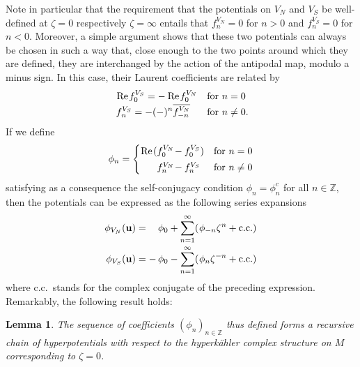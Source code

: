 \documentclass[11pt]{amsart}
\newtheorem{lemma}[theorem]{Lemma}
\theoremstyle{remark}
\theoremstyle{remark}
\theoremstyle{definition}
\theoremstyle{definition}
\theoremstyle{definition}
\newcommand{\0}{{\scriptstyle 0'}} %
\newcommand{\1}{{\scriptstyle 1'}}
\newcommand{\pt}{\hspace{1pt}} %
\newcommand{\hp}{\hspace{0.5pt}} %
\renewcommand{\Re}{\hp\mbox{Re}\pt} %
\begin{document}
Note in particular that the requirement that the potentials on $V_N$ and $V_S$ be well-defined at $\zeta = 0$ respectively $\zeta = \infty$ entails that $f^{V_N}_n \!= 0$ for $n>0$ and $f^{V_S}_n \!= 0$ for $n<0$. Moreover, a simple argument shows that these two potentials can always be chosen in such a way that, close enough to the two points around which they are defined, they are interchanged by the action of the antipodal map, modulo a minus sign. In this case, their Laurent coefficients are related by 
\begin{equation}
\begin{aligned}
& \Re f^{V_S}_0 = - \, \Re f^{V_N}_0 && \text{for $n = 0$} \\[-2.5pt]
& f^{V_S}_{\hp n} = - (-)^n \overline{f^{V_N}_{-n}} && \text{for $n \neq 0$\rlap{.}}
\end{aligned}
\end{equation}
If we define
\begin{equation} \label{pot-phi}
\phi_n = 
\begin{cases}
\Re (f^{V_N}_0 \!- f^{V_S}_0) & \text{for $n=0$} \\[2pt]
\phantom{\Re(}f^{V_N}_n \!- f^{V_S}_n & \text{for $n \neq 0$}
\end{cases}
\end{equation}
satisfying as a consequence the self-conjugacy condition $\phi_n = \phi^c_n$ for all $n \in \mathbb{Z}$, then the potentials can be expressed as the following series expansions
{\allowdisplaybreaks
\begin{equation} \label{N&S_pots}
\begin{aligned}
\phi_{V_N}(\mathbf{u}) & = \phantom{+\,} \phi_0 + \sum_{n=1}^{\infty} (\hp \phi_{-n} \zeta^n + \text{c.c.} ) \\[-1.5pt]
\phi_{V_S}(\mathbf{u}) & = - \, \phi_0 - \sum_{n=1}^{\infty} (\hp \phi_{n} \zeta^{-n} + \text{c.c.} ) 
\end{aligned}
\end{equation}
}%
where c.c.~stands for the complex conjugate of the preceding expression. Remarkably, the following result holds:

\begin{lemma} \label{different_version}
The sequence of coefficients $(\phi_n)_{n \in \mathbb{Z}}$ thus defined forms a recursive chain of hyperpotentials with respect to the hyperk\"ahler complex structure on $M$ corresponding to $\zeta = 0$. 
\end{lemma}
\end{document}
